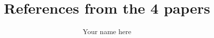 \documentclass{article}
\title{References from the 4 papers}
\author{Your name here}
\begin{document}
\maketitle

\nocite{*}

\printbibliography
\end{document}
